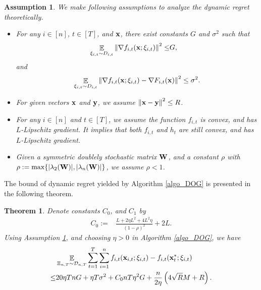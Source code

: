 \documentclass{article}
\newtheorem{Theorem}{\bf{Theorem}}
\newtheorem{Assumption}{\bf{Assumption}}
\begin{document}
\begin{Assumption}
\label{assumption_bounded_gradient_domain}
We make following assumptions to analyze the dynamic regret theoretically.
\begin{itemize}
\item For any $i\in[n]$, $t\in[T]$, and ${\bf x}$, there exist constants $G$ and $\sigma^2$ such that
\begin{align}
\nonumber
\mathop{\mathbb{E}}_{ \xi_{i,t} \sim D_{i,t} }\left\lVert\nabla f_{i,t}({\bf x};\xi_{i,t})\right\rVert^2 \le &  G,
\end{align} and 
\begin{align}
\nonumber
\mathop{\mathbb{E}}_{ \xi_{i,t} \sim D_{i,t} } \left\lVert\nabla f_{i,t}({\bf x}; \xi_{i,t}) - \nabla F_{i,t}({\bf x})\right\rVert^2 \le \sigma^2.
\end{align}
\item For given vectors ${\bf x}$ and ${\bf y}$, we assume $\left\lVert{\bf x}-{\bf y}\right\rVert^2 \le R$.
\item  For any $i\in[n]$ and $t\in[T]$, we assume the function $f_{i,t}$ is convex, and has $L$-Lipschitz gradient. It implies that both $f_{i,t}$ and $h_t$ are still convex, and has $L$-Lipschitz gradient.
\item Given a symmetric doublely stochastic matrix ${\bf W}$, and a constant $\rho$ with $\rho := \max\{ |\lambda_2({\bf W})|, |\lambda_n({\bf W})| \}$, we assume $\rho <1$.
\end{itemize}
\end{Assumption}




The bound of dynamic regret yielded by Algorithm \ref{algo_DOG} is presented in the following theorem. 
\begin{Theorem}
\label{theorem_regret_upper_bound}
Denote constants $C_0$, and $C_1$ by
\begin{align}
\nonumber
C_0 := & \frac{L + 2\eta L^2  + 4L^2 \eta}{(1-\rho)^2} +2L.
\end{align} Using Assumption \ref{assumption_bounded_gradient_domain}, and choosing $\eta>0$ in Algorithm \ref{algo_DOG}, we have
\begin{align}
\nonumber
& \mathop{\mathbb{E}}_{ \Xi_{n,T} \sim \mathcal{D}_{n,T} } \sum_{t=1}^T\sum_{i=1}^n f_{i,t}({\bf x}_{i,t};\xi_{i,t}) - f_{i,t}({\bf x}_t^\ast;\xi_{i,t}) \\ \nonumber
\le & 20\eta T n G +  \eta T\sigma^2 + C_0 nT\eta^2 G    + \frac{n}{2\eta}\left(  4\sqrt{R}M + R   \right).
\end{align}

\end{Theorem}
\end{document}

